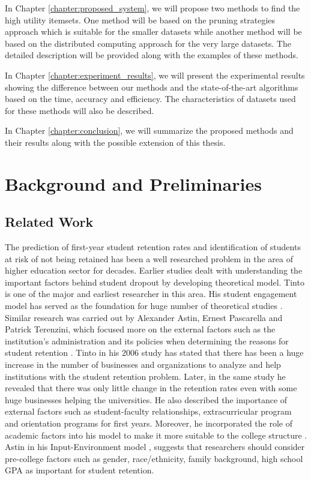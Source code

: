 \documentclass[11pt,openright]{report}
\begin{document}
\noindent In Chapter \ref{chapter:proposed_system}, we will propose two methods to find the high utility itemsets. One method will be based on the pruning strategies approach which is suitable for the smaller datasets while another method will be based on the distributed computing approach for the very large datasets. The detailed description will be provided along with the examples of these methods.
\newline

\noindent In Chapter \ref{chapter:experiment_results}, we will present the experimental results showing the difference between our methods and the state-of-the-art algorithms based on the time, accuracy and efficiency. The characteristics of datasets used for these methods will also be described.
\newline

\noindent In Chapter \ref{chapter:conclusion}, we will summarize the proposed methods and their results along with the possible extension of this thesis.

\chapter{Background and Preliminaries} \label{chapter:background}
\section{Related Work}\label{section:relatedwork}

The prediction of first-year student retention rates and identification of students at risk of not being retained has been a well researched problem in the area of higher education sector for decades. Earlier studies dealt with understanding the important factors behind student dropout by developing theoretical model. Tinto is one of the major and earliest researcher in this area. His student engagement model \cite{tinto1999taking} has served as the foundation for huge number of theoretical studies \cite{braxton2002introduction}. Similar research was carried out by Alexander Astin, Ernest Pascarella and Patrick Terenzini, which focused more on the external factors such as the institution's administration and its policies when determining the reasons for student retention \cite{astin2012assessment}. Tinto in his 2006 study \cite{tinto2006} has stated that there has been a huge increase in the number of businesses and organizations to analyze and help institutions with the student retention problem. Later, in the same study he revealed that there was only little change in the retention rates even with some huge businesses helping the universities. He also described the importance of external factors such as student-faculty relationships, extracurricular program and orientation programs for first years. Moreover, he incorporated the role of academic factors into his model to make it more suitable to the college structure \cite{tinto2006}. Astin in his Input-Environment model \cite{astin2012assessment}, suggests that researchers should consider pre-college factors such as gender, race/ethnicity, family background, high school GPA  as important for student retention.
\end{document}
